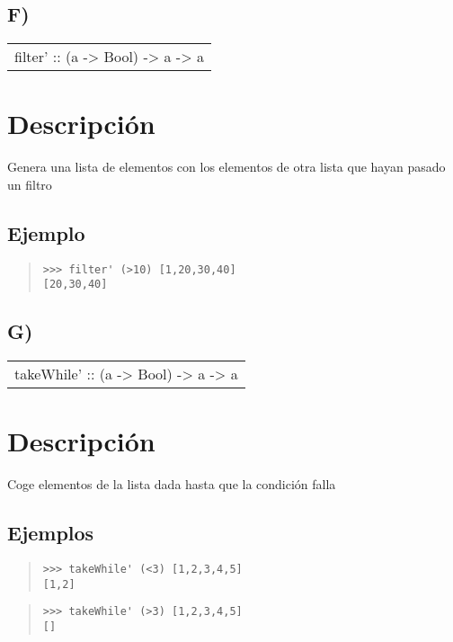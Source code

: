 \subsection{F)}
\begin{haddockdesc}
\item[\begin{tabular}{@{}l}
filter' :: (a -> Bool) -> {\char 91}a{\char 93} -> {\char 91}a{\char 93}
\end{tabular}]
{\haddockbegindoc
\section*{Descripción}
Genera una lista de elementos con los elementos de otra lista que hayan pasado un filtro\par
\subsection*{Ejemplo}
\begin{quote}
{\haddockverb\begin{verbatim}
>>> filter' (>10) [1,20,30,40]
[20,30,40]

\end{verbatim}}
\end{quote}}
\end{haddockdesc}
\subsection{G)}
\begin{haddockdesc}
\item[\begin{tabular}{@{}l}
takeWhile' :: (a -> Bool) -> {\char 91}a{\char 93} -> {\char 91}a{\char 93}
\end{tabular}]
{\haddockbegindoc
\section*{Descripción}
Coge elementos de la lista dada hasta que la condición falla\par
\subsection*{Ejemplos}
\begin{quote}
{\haddockverb\begin{verbatim}
>>> takeWhile' (<3) [1,2,3,4,5]
[1,2]

\end{verbatim}}
\end{quote}
\begin{quote}
{\haddockverb\begin{verbatim}
>>> takeWhile' (>3) [1,2,3,4,5]
[]

\end{verbatim}}
\end{quote}}
\end{haddockdesc}
